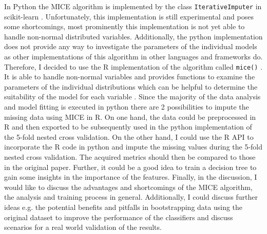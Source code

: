 \documentclass[12pt,a4paper,oneside]{article}
\newcommand{\code}{\texttt}
\begin{document}
In Python the MICE algorithm is implemented by the class \code{IterativeImputer} in scikit-learn \cite{scikit-learn}. Unfortunately, this implementation is still experimental and poses some shortcomings, most prominently this implementation is not yet able to handle non-normal distributed variables. Additionally, the python implementation does not provide any way to investigate the parameters of the individual models as other implementations of this algorithm in other languages and frameworks do. Therefore, I decided to use the R implementation of the algorithm called \code{mice()} \cite{RN135}. It is able to handle non-normal variables and provides functions to examine the parameters of the individual distributions which can be helpful to determine the suitability of the model for each variable \cite{RN142}. Since the majority of the data analysis and model fitting is executed in python there are 2 possibilities to impute the missing data using MICE in R. On one hand, the data could be preprocessed in R and then exported to be subsequently used in the python implementation of the 5-fold nested cross validation. 
On the other hand, I could use the R API to incorporate the R code in python and impute the missing values during the 5-fold nested cross validation.
The acquired metrics should then be compared to those in the original paper. Further, it could be a good idea to train a decision tree to gain some insights in the importance of the features. Finally, in the discussion, I would like to discuss the advantages and shortcomings of the MICE algorithm, the analysis and training process in general. Additionally, I could discuss further ideas e.g. the potential benefits and pitfalls in bootstrapping data using the original dataset to improve the performance of the classifiers and discuss scenarios for a real world validation of the results.
\printbibliography
\end{document}
